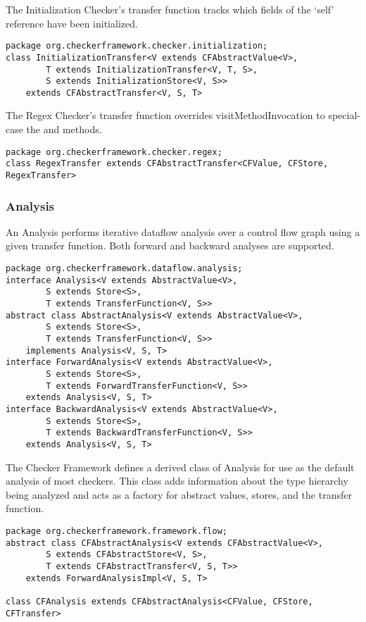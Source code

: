 The Initialization Checker's transfer function tracks which fields of
the `self' reference have been initialized.

\begin{verbatim}
package org.checkerframework.checker.initialization;
class InitializationTransfer<V extends CFAbstractValue<V>,
        T extends InitializationTransfer<V, T, S>,
        S extends InitializationStore<V, S>>
    extends CFAbstractTransfer<V, S, T>
\end{verbatim}

The Regex Checker's transfer function overrides visitMethodInvocation
to special-case the  and  methods.

\begin{verbatim}
package org.checkerframework.checker.regex;
class RegexTransfer extends CFAbstractTransfer<CFValue, CFStore, RegexTransfer>
\end{verbatim}


\subsubsection{Analysis}
\label{sec:analysis_classes}

An Analysis performs iterative dataflow analysis over a control flow
graph using a given transfer function.  Both forward and backward
analyses are supported.

\begin{verbatim}
package org.checkerframework.dataflow.analysis;
interface Analysis<V extends AbstractValue<V>,
        S extends Store<S>,
        T extends TransferFunction<V, S>>
abstract class AbstractAnalysis<V extends AbstractValue<V>,
        S extends Store<S>,
        T extends TransferFunction<V, S>>
    implements Analysis<V, S, T>
interface ForwardAnalysis<V extends AbstractValue<V>,
        S extends Store<S>,
        T extends ForwardTransferFunction<V, S>>
    extends Analysis<V, S, T>
interface BackwardAnalysis<V extends AbstractValue<V>,
        S extends Store<S>,
        T extends BackwardTransferFunction<V, S>>
    extends Analysis<V, S, T>
\end{verbatim}

The Checker Framework defines a derived class of Analysis for use as
the default analysis of most checkers.  This class adds information
about the type hierarchy being analyzed and acts as a factory for
abstract values, stores, and the transfer function.

\begin{verbatim}
package org.checkerframework.framework.flow;
abstract class CFAbstractAnalysis<V extends CFAbstractValue<V>,
        S extends CFAbstractStore<V, S>,
        T extends CFAbstractTransfer<V, S, T>>
    extends ForwardAnalysisImpl<V, S, T>

class CFAnalysis extends CFAbstractAnalysis<CFValue, CFStore, CFTransfer>
\end{verbatim}


